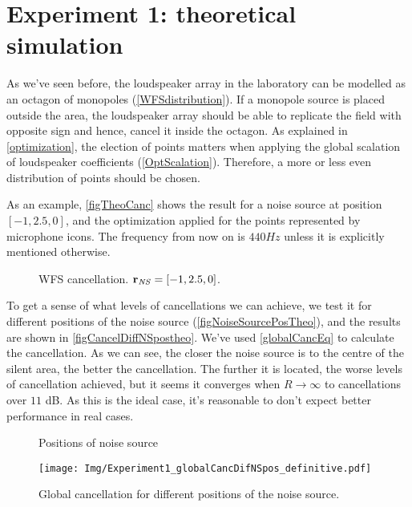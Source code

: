 \section{Experiment 1: theoretical simulation}
As we've seen before, the loudspeaker array in the laboratory can be modelled as an octagon of monopoles (\autoref{WFSdistribution}). If a monopole source is placed outside the area, the loudspeaker array should be able to replicate the field with opposite sign and hence, cancel it inside the octagon. As explained in \autoref{optimization}, the election of points matters when applying the global scalation of loudspeaker coefficients (\autoref{OptScalation}). Therefore, a more or less even distribution of points should be chosen.

As an example, \autoref{figTheoCanc} shows the result for a noise source at position $[-1, 2.5, 0]$, and the optimization applied for the points represented by microphone icons. The frequency from now on is $440\si{Hz}$ unless it is explicitly mentioned otherwise.

\begin{figure}
	\centering
	\caption[WFS cancellation]{WFS cancellation. $\pos[vecNS]{} = [-1, 2.5, 0]$.}
	\label{figTheoCanc}
\end{figure}

To get a sense of what levels of cancellations we can achieve, we test it for different positions of the noise source (\autoref{figNoiseSourcePosTheo}), and the results are shown in \autoref{figCancelDiffNSpostheo}. We've used \autoref{globalCancEq} to calculate the cancellation. As we can see, the closer the noise source is to the centre of the silent area, the better the cancellation. The further it is located, the worse levels of cancellation achieved, but it seems it converges when $R\rightarrow\infty$ to cancellations over $11$ dB. As this is the ideal case, it's reasonable to don't expect better performance in real cases.

\begin{figure}[h]
	\centering
	\begin{minipage}[b]{0.49\textwidth}
			\centering
			\def\svgwidth{\columnwidth}
			\graphicspath{{Img/}}
			
			\caption[Positions of noise source]{Positions of noise source}
			\label{figNoiseSourcePosTheo}
	\end{minipage}
	\begin{minipage}[b]{0.49\textwidth}
			\centering
		\texttt{[image: Img/Experiment1\_globalCancDifNSpos\_definitive.pdf]}
		\caption[Global cancellation. Theoretical model.]{Global cancellation for different positions of the noise source.}
		\label{figCancelDiffNSpostheo}
	\end{minipage}
\end{figure}

